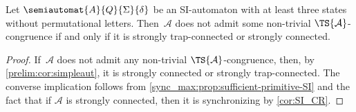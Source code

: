 	
	\begin{corollary} \label{prelim:classes:SI:without-perm-letters-SCC}
		Let $\semiautomat{A}{Q}{\Sigma}{\delta}$ be an SI-automaton with at least three states without permutational letters.
		Then~$\mathcal A$ does not admit some non-trivial $\TS{\mathcal A}$-congruence
		if and only if it is strongly trap-connected or strongly connected.	
	\end{corollary}
	\begin{proof}
		If~$\mathcal A$
		does not admit any non-trivial $\TS{\mathcal A}$-congruence,
		then, by \cref{prelim:cor:simpleaut}, 
		it is strongly connected or strongly trap-connected.	
		The converse implication follows from \cref{sync_max:prop:sufficient-primitive-SI} 
		and the fact that if $\mathcal A$ is strongly connected, then it is synchronizing
		by \cref{cor:SI_CR}.
	\end{proof}
	

